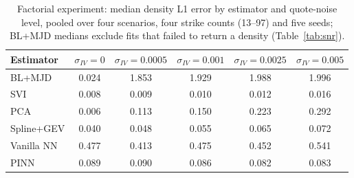 \begin{table}[htbp]
\centering
\caption{Factorial experiment: median density L1 error by estimator and quote-noise level, pooled over four scenarios, four strike counts (13--97) and five seeds; BL+MJD medians exclude fits that failed to return a density (Table~\ref{tab:snr}).}
\label{tab:noise}
\small
\begin{tabular}{lccccc}
\toprule
Estimator & $\sigma_{IV}=0$ & $\sigma_{IV}=0.0005$ & $\sigma_{IV}=0.001$ & $\sigma_{IV}=0.0025$ & $\sigma_{IV}=0.005$ \\
\midrule
BL+MJD & 0.024 & 1.853 & 1.929 & 1.988 & 1.996 \\
SVI & 0.008 & 0.009 & 0.010 & 0.012 & 0.016 \\
PCA & 0.006 & 0.113 & 0.150 & 0.223 & 0.292 \\
Spline+GEV & 0.040 & 0.048 & 0.055 & 0.065 & 0.072 \\
Vanilla NN & 0.477 & 0.413 & 0.475 & 0.452 & 0.541 \\
PINN & 0.089 & 0.090 & 0.086 & 0.082 & 0.083 \\
\bottomrule
\end{tabular}
\end{table}
